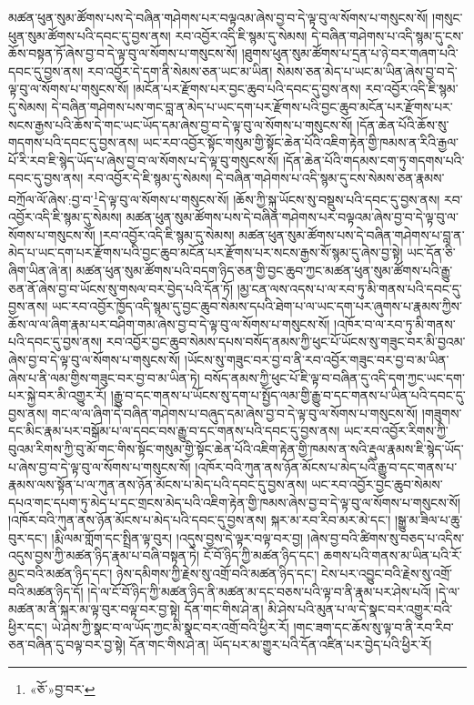 མཚན་ཕུན་སུམ་ཚོགས་པས་དེ་བཞིན་གཤེགས་པར་བལྟའམ་ཞེས་བྱ་བ་དེ་ལྟ་བུ་ལ་སོགས་པ་གསུངས་སོ། །གསུང་ཕུན་སུམ་ཚོགས་པའི་དབང་དུ་བྱས་ནས། རབ་འབྱོར་འདི་ཇི་སྙམ་དུ་སེམས། དེ་བཞིན་གཤེགས་པ་འདི་སྙམ་དུ་ངས་ཆོས་བསྟན་ཏོ་ཞེས་བྱ་བ་དེ་ལྟ་བུ་ལ་སོགས་པ་གསུངས་སོ། །ཐུགས་ཕུན་སུམ་ཚོགས་པ་དྲན་པ་ཉེ་བར་གཞག་པའི་དབང་དུ་བྱས་ནས། རབ་འབྱོར་དེ་དག་ནི་སེམས་ཅན་ཡང་མ་ཡིན། སེམས་ཅན་མེད་པ་ཡང་མ་ཡིན་ཞེས་བྱ་བ་དེ་ལྟ་བུ་ལ་སོགས་པ་གསུངས་སོ། །མངོན་པར་རྫོགས་པར་བྱང་ཆུབ་པའི་དབང་དུ་བྱས་ནས། རབ་འབྱོར་འདི་ཇི་སྙམ་དུ་སེམས། དེ་བཞིན་གཤེགས་པས་གང་བླ་ན་མེད་པ་ཡང་དག་པར་རྫོགས་པའི་བྱང་ཆུབ་མངོན་པར་རྫོགས་པར་སངས་རྒྱས་པའི་ཆོས་དེ་གང་ཡང་ཡོད་དམ་ཞེས་བྱ་བ་དེ་ལྟ་བུ་ལ་སོགས་པ་གསུངས་སོ། །དོན་ཆེན་པོའི་ཆོས་སུ་གདགས་པའི་དབང་དུ་བྱས་ནས། ཡང་རབ་འབྱོར་སྟོང་གསུམ་གྱི་སྟོང་ཆེན་པོའི་འཇིག་རྟེན་གྱི་ཁམས་ན་རིའི་རྒྱལ་པོ་རི་རབ་ཇི་སྙེད་ཡོད་པ་ཞེས་བྱ་བ་ལ་སོགས་པ་དེ་ལྟ་བུ་གསུངས་སོ། །དོན་ཆེན་པོའི་གདམས་ངག་ཏུ་གདགས་པའི་དབང་དུ་བྱས་ནས། རབ་འབྱོར་དེ་ཇི་སྙམ་དུ་སེམས། དེ་བཞིན་གཤེགས་པ་འདི་སྙམ་དུ་ངས་སེམས་ཅན་རྣམས་བཀྲོལ་ལོ་ཞེས་:བྱ་བ་\footnote{«ཅོ་»བྱ་བར་}དེ་ལྟ་བུ་ལ་སོགས་པ་གསུངས་སོ། །ཆོས་ཀྱི་སྐུ་ཡོངས་སུ་བསྡུས་པའི་དབང་དུ་བྱས་ནས། རབ་འབྱོར་འདི་ཇི་སྙམ་དུ་སེམས། མཚན་ཕུན་སུམ་ཚོགས་པས་དེ་བཞིན་གཤེགས་པར་བལྟའམ་ཞེས་བྱ་བ་དེ་ལྟ་བུ་ལ་སོགས་པ་གསུངས་སོ། །རབ་འབྱོར་འདི་ཇི་སྙམ་དུ་སེམས། མཚན་ཕུན་སུམ་ཚོགས་པས་དེ་བཞིན་གཤེགས་པ་བླ་ན་མེད་པ་ཡང་དག་པར་རྫོགས་པའི་བྱང་ཆུབ་མངོན་པར་རྫོགས་པར་སངས་རྒྱས་སོ་སྙམ་དུ་ཞེས་བྱ་སྟེ། ཡང་དོན་ཅི་ཞིག་ཡིན་ཞེ་ན། མཚན་ཕུན་སུམ་ཚོགས་པའི་བདག་ཉིད་ཅན་གྱི་བྱང་ཆུབ་ཀྱང་མཚན་ཕུན་སུམ་ཚོགས་པའི་རྒྱུ་ཅན་ནོ་ཞེས་བྱ་བ་ཡོངས་སུ་གསལ་བར་བྱེད་པའི་དོན་ཏོ། །མྱ་ངན་ལས་འདས་པ་ལ་རབ་ཏུ་མི་གནས་པའི་དབང་དུ་བྱས་ནས། ཡང་རབ་འབྱོར་ཁྱོད་འདི་སྙམ་དུ་བྱང་ཆུབ་སེམས་དཔའི་ཐེག་པ་ལ་ཡང་དག་པར་ཞུགས་པ་རྣམས་ཀྱིས་ཆོས་ལ་ལ་ཞིག་རྣམ་པར་བཤིག་གམ་ཞེས་བྱ་བ་དེ་ལྟ་བུ་ལ་སོགས་པ་གསུངས་སོ། །འཁོར་བ་ལ་རབ་ཏུ་མི་གནས་པའི་དབང་དུ་བྱས་ནས། རབ་འབྱོར་བྱང་ཆུབ་སེམས་དཔས་བསོད་ནམས་ཀྱི་ཕུང་པོ་ཡོངས་སུ་གཟུང་བར་མི་བྱའམ་ཞེས་བྱ་བ་དེ་ལྟ་བུ་ལ་སོགས་པ་གསུངས་སོ། །ཡོངས་སུ་གཟུང་བར་བྱ་བ་ནི་རབ་འབྱོར་གཟུང་བར་བྱ་བ་མ་ཡིན་ཞེས་པ་ནི་ལམ་གྱིས་གཟུང་བར་བྱ་བ་མ་ཡིན་ཏེ། བསོད་ནམས་ཀྱི་ཕུང་པོ་ཇི་ལྟ་བ་བཞིན་དུ་འདི་དག་ཀྱང་ཡང་དག་པར་སྐྱེ་བར་མི་འགྱུར་རོ། །རྒྱུ་བ་དང་གནས་པ་ཡོངས་སུ་དག་པ་སྤྱོད་ལམ་གྱི་རྒྱུ་བ་དང་གནས་པ་ཡིན་པའི་དབང་དུ་བྱས་ནས། གང་ལ་ལ་ཞིག་དེ་བཞིན་གཤེགས་པ་བཞུད་དམ་ཞེས་བྱ་བ་དེ་ལྟ་བུ་ལ་སོགས་པ་གསུངས་སོ། །གཟུགས་དང་མིང་རྣམ་པར་བསྒོམ་པ་ལ་དབང་བས་རྒྱུ་བ་དང་གནས་པའི་དབང་དུ་བྱས་ནས། ཡང་རབ་འབྱོར་རིགས་ཀྱི་བུའམ་རིགས་ཀྱི་བུ་མོ་གང་གིས་སྟོང་གསུམ་གྱི་སྟོང་ཆེན་པོའི་འཇིག་རྟེན་གྱི་ཁམས་ན་སའི་རྡུལ་རྣམས་ཇི་སྙེད་ཡོད་པ་ཞེས་བྱ་བ་དེ་ལྟ་བུ་ལ་སོགས་པ་གསུངས་སོ། །འཁོར་བའི་ཀུན་ནས་ཉོན་མོངས་པ་མེད་པའི་རྒྱུ་བ་དང་གནས་པ་རྣམས་ལས་སྟོན་པ་ལ་ཀུན་ནས་ཉོན་མོངས་པ་མེད་པའི་དབང་དུ་བྱས་ནས། ཡང་རབ་འབྱོར་བྱང་ཆུབ་སེམས་དཔའ་གང་དཔག་ཏུ་མེད་པ་དང་གྲངས་མེད་པའི་འཇིག་རྟེན་གྱི་ཁམས་ཞེས་བྱ་བ་དེ་ལྟ་བུ་ལ་སོགས་པ་གསུངས་སོ། །འཁོར་བའི་ཀུན་ནས་ཉོན་མོངས་པ་མེད་པའི་དབང་དུ་བྱས་ནས། སྐར་མ་རབ་རིབ་མར་མེ་དང་། །སྒྱུ་མ་ཟིལ་པ་ཆུ་བུར་དང་། །རྨི་ལམ་གློག་དང་སྤྲིན་ལྟ་བུར། །འདུས་བྱས་དེ་ལྟར་བལྟ་བར་བྱ། །ཞེས་བྱ་བའི་ཚིགས་སུ་བཅད་པ་འདིས་འདུས་བྱས་ཀྱི་མཚན་ཉིད་རྣམ་པ་བཞི་བསྟན་ཏེ། ངོ་བོ་ཉིད་ཀྱི་མཚན་ཉིད་དང་། ཆགས་པའི་གནས་མ་ཡིན་པའི་རོ་མྱང་བའི་མཚན་ཉིད་དང་། ཉེས་དམིགས་ཀྱི་རྗེས་སུ་འགྲོ་བའི་མཚན་ཉིད་དང་། ངེས་པར་འབྱུང་བའི་རྗེས་སུ་འགྲོ་བའི་མཚན་ཉིད་དོ། །དེ་ལ་ངོ་བོ་ཉིད་ཀྱི་མཚན་ཉིད་ནི་མཚན་མ་དང་བཅས་པའི་ལྟ་བ་ནི་རྣམ་པར་ཤེས་པའོ། །དེ་ལ་མཚན་མ་ནི་སྐར་མ་ལྟ་བུར་བལྟ་བར་བྱ་སྟེ། དོན་གང་གིས་ཤེ་ན། མི་ཤེས་པའི་མུན་པ་ལ་དེ་སྣང་བར་འགྱུར་བའི་ཕྱིར་དང་། ཡེ་ཤེས་ཀྱི་སྣང་བ་ལ་ཡོད་ཀྱང་མི་སྣང་བར་འགྲོ་བའི་ཕྱིར་རོ། །གང་ཟག་དང་ཆོས་སུ་ལྟ་བ་ནི་རབ་རིབ་ཅན་བཞིན་དུ་བལྟ་བར་བྱ་སྟེ། དོན་གང་གིས་ཤེ་ན། ཡོད་པར་མ་གྱུར་པའི་དོན་འཛིན་པར་བྱེད་པའི་ཕྱིར་རོ། 